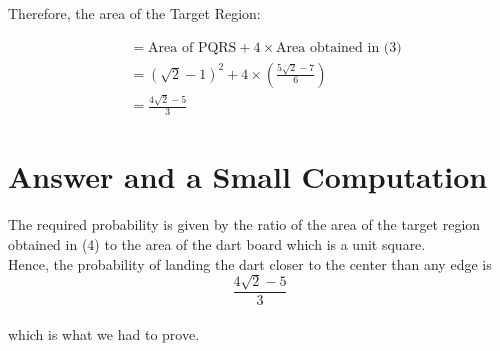 \documentclass[10pt]{article}
\begin{document}
Therefore, the area of the Target Region:

\begin{equation}
\begin{split}
&= \text{Area of PQRS} + 4 \times \text{Area obtained in (3)}\\
&= {(\sqrt{2} - 1)}^2 + 4 \times \left(\frac{5\sqrt{2} - 7}{6}\right)\\
&= \frac{4\sqrt{2} - 5}{3}
\end{split}
\end{equation}
\newpage
\section{Answer and a Small Computation}
The required probability is given by the ratio of the area of the target region obtained in (4) to the area of the dart board which is a unit square.\\

Hence, the probability of landing the dart closer to the center than any edge is $$\frac{4\sqrt{2} - 5}{3}$$\\
which is what we had to prove.
\end{document}
